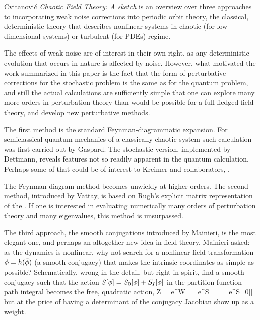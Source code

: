 Cvitanovi\'{c}
{\em {Chaotic Field Theory}: {A} sketch}
is an overview over three approaches to incorporating weak noise
corrections into periodic orbit theory, the classical, deterministic
theory that describes nonlinear systems in chaotic (for low-dimensional
systems) or turbulent (for PDEs) regime.

The effects of weak noise are of interest in their own right, as any
deterministic evolution that occurs in nature is affected by noise.
However, what motivated the work
summarized in this paper is the fact that the form of perturbative
corrections for the stochastic problem  is the same as for the quantum
problem, and still the actual calculations are sufficiently simple that
one can explore many more orders in perturbation theory than would be
possible for a full-fledged field theory, and develop new perturbative
methods.

The first method is the standard Feynman-diagrammatic expansion. For
semiclassical quantum mechanics of a classically chaotic system such
calculation was first carried out by Gaspard. The stochastic
version, implemented by Dettmann, reveals features not so
readily apparent in the quantum calculation. Perhaps some of that
could be of interest to Kreimer and collaborators, .

The Feynman diagram method becomes unwieldy at higher orders. The second
method, introduced by Vattay, is based on Rugh's
explicit matrix representation of the {\evOper}. If one is interested in
evaluating numerically many orders of perturbation theory and many
eigenvalues, this method is unsurpassed.

The third approach, the smooth conjugations introduced by
Mainieri, is the most elegant one, and perhaps an
altogether new idea in field theory.
Mainieri asked: as the dynamics is
nonlinear, why not search for a nonlinear field transformation
${\phi} = h(\tilde{{\phi}})$ (a smooth conjugacy) that
makes the intrinsic coordinates as simple as possible? Schematically,
wrong in the detail, but right in spirit, find a smooth conjugacy
such that the action $S[{\phi}] = S_0[{\phi}] + S_I[{\phi}]$ in the
partition function path integral
becomes the free, quadratic action,
\beq
Z %
	 =  e^{W} %
\,=\, \int [d\field] e^{S[\field]} %
\,=\, 
       \, e^{S_0[\tilde{\field}]}
\label{Z-J}
\eeq
but at the price of having a determinant of the
conjugacy Jacobian show up as a weight.

